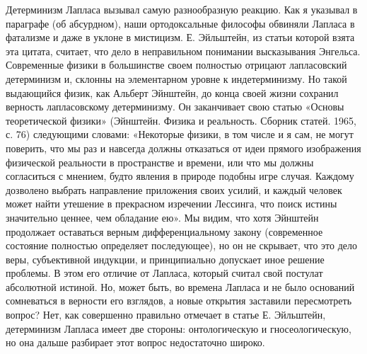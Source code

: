 Детерминизм Лапласа вызывал самую разнообразную реакцию. Как я указывал в
параграфе (об абсурдном), наши ортодоксальные философы обвиняли Лапласа в
фатализме и даже в уклоне в мистицизм. Е.  Эйльштейн, из статьи которой взята
эта цитата, считает, что дело в неправильном понимании высказывания Энгельса.
Современные физики в большинстве своем полностью отрицают лапласовский
детерминизм и, склонны на элементарном уровне к индетерминизму. Но такой
выдающийся физик, как Альберт Эйнштейн, до конца своей жизни сохранил верность
лапласовскому детерминизму. Он заканчивает свою статью «Основы теоретической
физики» (Эйнштейн. Физика и реальность. Сборник статей. 1965, с. 76) следующими
словами: «Некоторые физики, в том числе и я сам, не могут поверить, что мы раз
и навсегда должны отказаться от идеи прямого изображения физической реальности
в пространстве и времени, или что мы должны согласиться с мнением, будто
явления в природе подобны игре случая. Каждому дозволено выбрать направление
приложения своих усилий, и каждый человек может найти утешение в прекрасном
изречении Лессинга, что поиск истины значительно ценнее, чем обладание ею». Мы
видим, что хотя Эйнштейн продолжает оставаться верным дифференциальному закону
(современное состояние полностью определяет последующее), но он не скрывает,
что это дело веры, субъективной индукции, и принципиально допускает иное
решение проблемы. В этом его отличие от Лапласа, который считал свой постулат
абсолютной истиной. Но, может быть, во времена Лапласа и не было оснований
сомневаться в верности его взглядов, а новые открытия заставили пересмотреть
вопрос? Нет, как совершенно правильно отмечает в статье Е. Эйльштейн,
детерминизм Лапласа имеет две стороны: онтологическую и гносеологическую, но
она дальше разбирает этот вопрос недостаточно широко.

